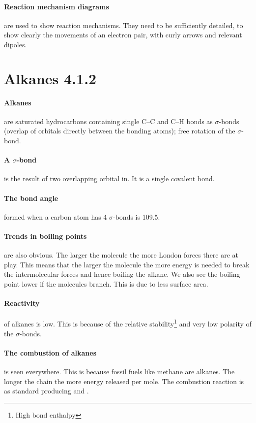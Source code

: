 	\paragraph{Reaction mechanism diagrams} are used to show reaction mechanisms. They need to be sufficiently detailed, to show clearly the movements of an electron pair, with curly arrows and relevant dipoles.
	
\section{Alkanes 4.1.2}
	
	\paragraph{Alkanes} are saturated hydrocarbons containing single C–C and C–H bonds as $\sigma$-bonds (overlap of orbitals directly between the bonding atoms); free rotation of the $\sigma$-bond.
	
	\paragraph{A $\sigma$-bond} is the result of two overlapping orbital in. It is a single covalent bond.
	
	\paragraph{The bond angle} formed when a carbon atom has 4 $\sigma$-bonds is 109.5\degree .
	
	\paragraph{Trends in boiling points} are also obvious. The larger the molecule the more London forces there are at play. This means that the larger the molecule the more energy is needed to break the intermolecular forces and hence boiling the alkane. We also see the boiling point lower if the molecules branch. This is due to less surface area.
	
	\paragraph{Reactivity} of alkanes is low. This is because of the relative stability\footnote{High bond enthalpy} and very low polarity of the $\sigma$-bonds. 
	
	\paragraph{The combustion of alkanes} is seen everywhere. This is because fossil fuels like methane are alkanes. The longer the chain the more energy released per mole. The combustion reaction is as standard producing  and .
	
